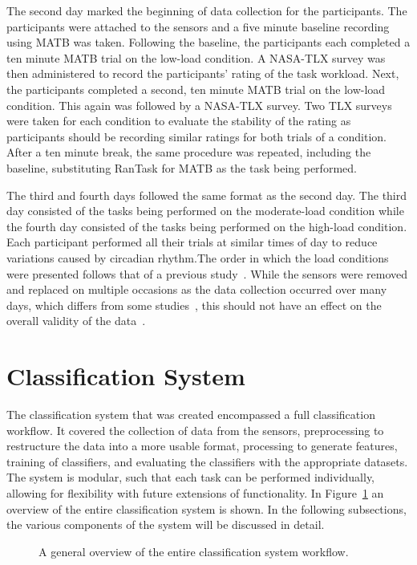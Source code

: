 \documentclass[11pt]{article}
\begin{document}
	The second day marked the beginning of data collection for the participants. The participants were attached to the sensors and a five minute baseline recording using MATB was taken. Following the baseline, the participants each completed a ten minute MATB trial on the low-load condition. A NASA-TLX survey was then administered to record the participants' rating of the task workload. Next, the participants completed a second, ten minute MATB trial on the low-load condition. This again was followed by a NASA-TLX survey. Two TLX surveys were taken for each condition to evaluate the stability of the rating as participants should be recording similar ratings for both trials of a condition. After a ten minute break, the same procedure was repeated, including the baseline, substituting RanTask for MATB as the task being performed.
	
	The third and fourth days followed the same format as the second day. The third day consisted of the tasks being performed on the moderate-load condition while the fourth day consisted of the tasks being performed on the high-load condition. Each participant performed all their trials at similar times of day to reduce variations caused by circadian rhythm.The order in which the load conditions were presented follows that of a previous study~\cite{Wilson}. While the sensors were removed and replaced on multiple occasions as the data collection occurred over many days, which differs from some studies~\cite{Wilson, Ke, Zhang}, this should not have an effect on the overall validity of the data~\cite{Estepp_2015}.


\section{Classification System}
The classification system that was created encompassed a full classification workflow. It covered the collection of data from the sensors, preprocessing to restructure the data into a more usable format, processing to generate features, training of classifiers, and evaluating the classifiers with the appropriate datasets. The system is modular, such that each task can be performed individually, allowing for flexibility with future extensions of functionality. 
In Figure~\ref{fig:system-overview} an overview of the entire classification system is shown. In the following subsections, the various components of the system will be discussed in detail. 
\begin{figure}
\centering
{}
\caption[General Overview of Complete Classification System Workflow]{A general overview of the entire classification system workflow.}
\label{fig:system-overview}
\end{figure} 
\end{document}
